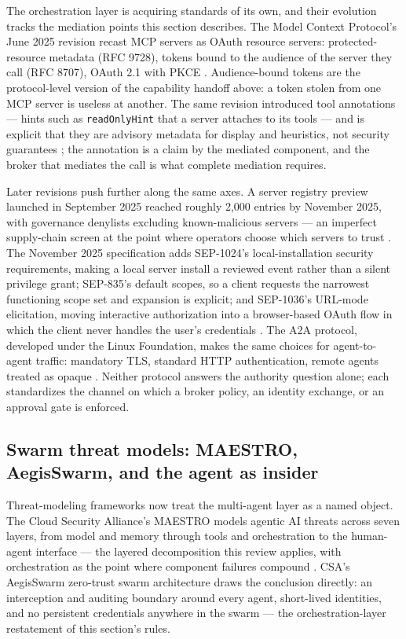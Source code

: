 \documentclass[
  english,
  9pt,
]{extarticle}
\begin{document}
The orchestration layer is acquiring standards of its own, and their
evolution tracks the mediation points this section describes. The Model
Context Protocol's June 2025 revision recast MCP servers as OAuth
resource servers: protected-resource metadata (RFC 9728), tokens bound
to the audience of the server they call (RFC 8707), OAuth 2.1 with PKCE
\citep{mcp_spec_changelog}. Audience-bound tokens are the protocol-level
version of the capability handoff above: a token stolen from one MCP
server is useless at another. The same revision introduced tool
annotations --- hints such as \texttt{readOnlyHint} that a server
attaches to its tools --- and is explicit that they are advisory
metadata for display and heuristics, not security guarantees
\citep{mcp_tools_annotations}; the annotation is a claim by the mediated
component, and the broker that mediates the call is what complete
mediation requires.

Later revisions push further along the same axes. A server registry
preview launched in September 2025 reached roughly 2,000 entries by
November 2025, with governance denylists excluding known-malicious
servers --- an imperfect supply-chain screen at the point where
operators choose which servers to trust \citep{mcp_registry_preview}.
The November 2025 specification adds SEP-1024's local-installation
security requirements, making a local server install a reviewed event
rather than a silent privilege grant; SEP-835's default scopes, so a
client requests the narrowest functioning scope set and expansion is
explicit; and SEP-1036's URL-mode elicitation, moving interactive
authorization into a browser-based OAuth flow in which the client never
handles the user's credentials \citep{mcp_spec_2025_11}. The A2A
protocol, developed under the Linux Foundation, makes the same choices
for agent-to-agent traffic: mandatory TLS, standard HTTP authentication,
remote agents treated as opaque \citep{a2a_protocol}. Neither protocol
answers the authority question alone; each standardizes the channel on
which a broker policy, an identity exchange, or an approval gate is
enforced.

\subsection{Swarm threat models: MAESTRO, AegisSwarm, and the agent as
insider}\label{swarm-threat-models-maestro-aegisswarm-and-the-agent-as-insider}

Threat-modeling frameworks now treat the multi-agent layer as a named
object. The Cloud Security Alliance's MAESTRO models agentic AI threats
across seven layers, from model and memory through tools and
orchestration to the human-agent interface --- the layered decomposition
this review applies, with orchestration as the point where component
failures compound \citep{csa_maestro}. CSA's AegisSwarm zero-trust swarm
architecture draws the conclusion directly: an interception and auditing
boundary around every agent, short-lived identities, and no persistent
credentials anywhere in the swarm \citep{csa_securing_swarm} --- the
orchestration-layer restatement of this section's rules.
\end{document}
